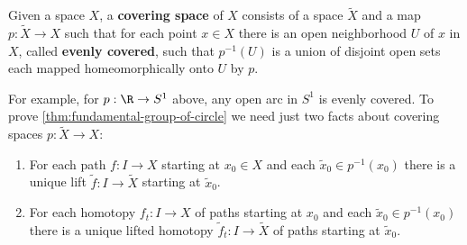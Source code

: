 \begin{definition}
\label{def:covering-space}
Given a space $X$, a \textbf{covering space} of $X$ consists of a space $\tilde X$ and a map
$p : \tilde X \to X$ such that for each point $x \in X$ there is an open neighborhood $U$ of
$x$ in $X$, called \textbf{evenly covered}, such that $p^{-1}(U)$ is a union of disjoint open sets
each mapped homeomorphically onto $U$ by $p$.
\end{definition}

For example, for $p : \R \to S^1$ above, any open arc in $S^1$ is evenly covered. To
prove \cref{thm:fundamental-group-of-circle} we need just two facts about covering spaces
$p : \tilde X \to X$:
\begin{enumerate}
\item[(a)] For each path $f : I \to X$ starting at $x_0 \in X$ and each $\tilde x_0 \in p^{-1}(x_0)$
there is a unique lift $\tilde f : I \to \tilde X$ starting at $\tilde x_0$.
\item[(b)] For each homotopy $f_t : I \to X$ of paths starting at $x_0$ and each
$\tilde x_0 \in p^{-1}(x_0)$ there is a unique lifted homotopy $\tilde f_t : I \to \tilde X$ of paths starting
at $\tilde x_0$.
\end{enumerate}

